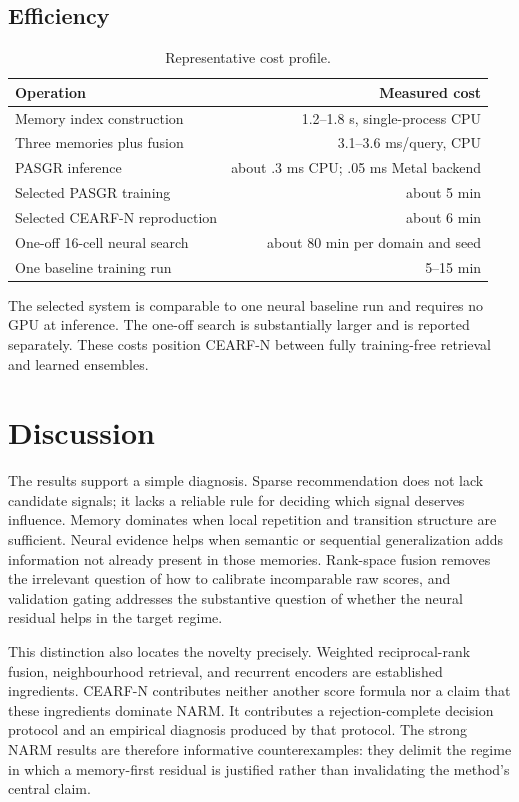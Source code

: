 \documentclass[runningheads]{llncs}
\newcommand{\method}{CEARF-N}
\begin{document}
\subsection{Efficiency}
\begin{table}[t]
\caption{Representative cost profile.}
\label{tab:efficiency}\centering\small
\begin{tabular}{lr}
\toprule Operation & Measured cost \\
\midrule
Memory index construction & 1.2--1.8 s, single-process CPU \\
Three memories plus fusion & 3.1--3.6 ms/query, CPU \\
PASGR inference & about .3 ms CPU; .05 ms Metal backend \\
Selected PASGR training & about 5 min \\
Selected \method{} reproduction & about 6 min \\
One-off 16-cell neural search & about 80 min per domain and seed \\
One baseline training run & 5--15 min \\
\bottomrule
\end{tabular}
\end{table}

The selected system is comparable to one neural baseline run and requires no
GPU at inference. The one-off search is substantially larger and is reported
separately. These costs position \method{} between fully training-free
retrieval and learned ensembles.

\section{Discussion}
The results support a simple diagnosis. Sparse recommendation does not lack
candidate signals; it lacks a reliable rule for deciding which signal deserves
influence. Memory dominates when local repetition and transition structure are
sufficient. Neural evidence helps when semantic or sequential generalization
adds information not already present in those memories. Rank-space fusion
removes the irrelevant question of how to calibrate incomparable raw scores,
and validation gating addresses the substantive question of whether the neural
residual helps in the target regime.

This distinction also locates the novelty precisely. Weighted reciprocal-rank
fusion, neighbourhood retrieval, and recurrent encoders are established
ingredients. \method{} contributes neither another score formula nor a claim
that these ingredients dominate NARM. It contributes a rejection-complete
decision protocol and an empirical diagnosis produced by that protocol. The
strong NARM results are therefore informative counterexamples: they delimit
the regime in which a memory-first residual is justified rather than
invalidating the method's central claim.
\end{document}
